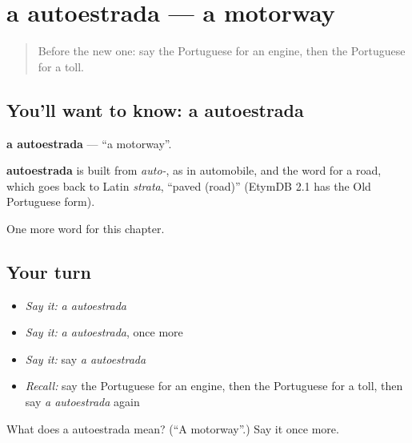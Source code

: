 \section[a autoestrada]{a autoestrada — a motorway}

\label{lesson:PT-C249-autoestrada}



\begin{quote}
Before the new one: say the Portuguese for an engine, then the Portuguese for a toll.
\end{quote}

\subsection*{You'll want to know: a autoestrada}
\textbf{a autoestrada} — \textquotedblleft{}a motorway\textquotedblright{}.

\begin{cousinweb}
\textbf{autoestrada} is built from \emph{auto-}, as in automobile, and the word for a road, which goes back to Latin \emph{strata}, \textquotedblleft{}paved (road)\textquotedblright{} (EtymDB 2.1 has the Old Portuguese form).
\end{cousinweb}

\begin{grammarlens}[title={What you've built}]
One more word for this chapter.
\end{grammarlens}

\subsection*{Your turn}
\begin{itemize}
\raggedright
  \item \emph{Say it:} \emph{a autoestrada}
  \item \emph{Say it:} \emph{a autoestrada}, once more
  \item \emph{Say it:} say \emph{a autoestrada}
  \item \emph{Recall:} say the Portuguese for an engine, then the Portuguese for a toll, then say \emph{a autoestrada} again
\end{itemize}

\begin{tcolorbox}[breakable,colback=teal!4,colframe=teal!35!black,title={Before you move on}]
What does a autoestrada mean? (\textquotedblleft{}A motorway\textquotedblright{}.) Say it once more.
\end{tcolorbox}
